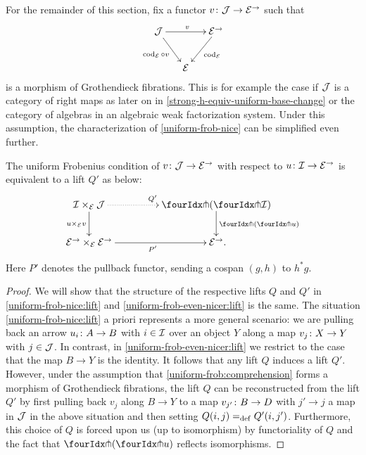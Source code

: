 \documentclass[reqno,10pt,a4paper,oneside,draft]{amsart}
\begin{document}
For the remainder of this section, fix a functor $v \co \cal{J} \to \cal{E}^\to$ such that
\begin{equation} \label{uniform-frob:comprehension}
\begin{gathered}
\xymatrix@C-1em{
  \cal{J}
  \ar[rr]^{v}
  \ar[dr]_{\cod_{\cal{E}} \cc v}
&&
  \cal{E}^\to
  \ar[dl]^{\cod_{\cal{E}}}
\\&
  \cal{E}
}
\end{gathered}
\end{equation}
is a morphism of Grothendieck fibrations.
This is for example the case if $\cal{J}$ is a category of right maps as later on in \cref{strong-h-equiv-uniform-base-change} or the category of algebras in an algebraic weak factorization system.
Under this assumption, the characterization of \cref{uniform-frob-nice} can be simplified even further.

\begin{proposition}
\label{uniform-frob-even-nicer}
The uniform Frobenius condition of $v \co \cal{J} \to \cal{E}^\to$ with respect to $u \co \cal{I} \to \cal{E}^\to$ is equivalent to a lift $Q'$ as below:
\begin{equation} \label{uniform-frob-even-nicer:lift}
\begin{gathered}
\xymatrix@C+2em{
  \cal{I} \times_{\cal{E}} \cal{J}
  \ar@{.>}[r]^{Q'}
  \ar[d]_{u \times_{\cal{E}} v}
&
  \liftl{(\liftr{\cal{I}})}
  \ar[d]^{\liftl{(\liftr{u})}}
\\
  \cal{E}^\to \times_{\cal{E}} \cal{E}^\to
  \ar[r]_{P'}
&
  \cal{E}^\to
\rlap{.}}
\end{gathered}
\end{equation}
Here $P'$ denotes the pullback functor, sending a cospan $(g, h)$ to $h^* g$.
\end{proposition}

\begin{proof}
We will show that the structure of the respective lifts $Q$ and $Q'$ in \eqref{uniform-frob-nice:lift} and \eqref{uniform-frob-even-nicer:lift} is the same.
The situation \eqref{uniform-frob-nice:lift} a priori represents a more general scenario: we are pulling back an arrow $u_i \co A \to B$ with $i \in \cal{I}$ over an object $Y$ along a map $v_j \co X \to Y$ with $j \in \cal{J}$.
In contrast, in \eqref{uniform-frob-even-nicer:lift} we restrict to the case that the map $B \to Y$ is the identity.
It follows that any lift $Q$ induces a lift $Q'$.
However, under the assumption that \eqref{uniform-frob:comprehension} forms a morphism of Grothendieck fibrations, the lift $Q$ can be reconstructed from the lift $Q'$ by first pulling back $v_j$ along $B \to Y$ to a map $v_{j'} \co B \to D$ with $j' \to j$ a map in $\cal{J}$ in the above situation and then setting $Q(i, j) \defeq Q'(i, j')$.
Furthermore, this choice of $Q$ is forced upon us (up to isomorphism) by functoriality of $Q$ and the fact that $\liftl{(\liftr{u})}$ reflects isomorphisms.
\end{proof}
\end{document}
